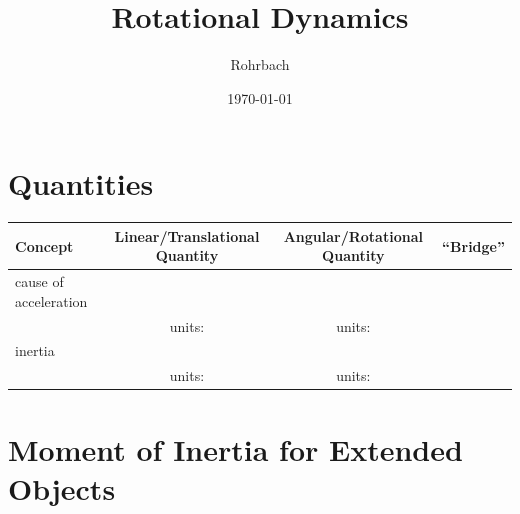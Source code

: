 \documentclass[10pt]{exam}
\title{Rotational Dynamics}
\author{Rohrbach}
\date{\today}
\begin{document}
\maketitle


\section*{Quantities}

\renewcommand{\arraystretch}{2}

\begin{tabular}{p{9em}ccp{6.5em}}
  Concept & Linear/Translational Quantity & Angular/Rotational Quantity & \hfill ``Bridge'' \\ \hline\hline
  cause of acceleration \\[1em] & units: & units:  \\\hline
  inertia \\[1em] & units: & units:  \\\hline
\end{tabular}

\vs

\section*{Moment of Inertia for Extended Objects}
\end{document}
